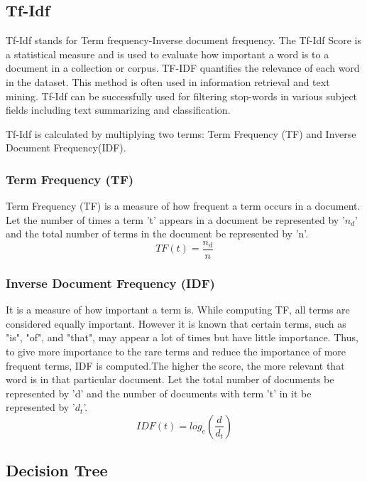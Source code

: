 \documentclass[preprint,12pt]{elsarticle}
\begin{document}
\subsection{Tf-Idf}

Tf-Idf stands for Term frequency-Inverse document frequency. The Tf-Idf Score is a statistical measure and is used to evaluate how important a word is to a document in a collection or corpus. TF-IDF quantifies the relevance of each word in the dataset. This method is often used in information retrieval and text mining. Tf-Idf can be successfully used for filtering stop-words \cite{tfidf_1,tfidf_2,tfidf_3} in various subject fields including text summarizing and classification.

Tf-Idf is calculated by multiplying two terms: Term Frequency (TF) and Inverse Document Frequency(IDF).

\subsubsection{Term Frequency (TF)}
Term Frequency (TF) is a measure of how frequent a term occurs in a document. Let the number of times a term 't' appears in a document be represented by '$n_d$' and the total number of terms in the document be represented by 'n'.
\begin{equation}
TF(t) = \dfrac{{n_d}}{n}
\end{equation}
\subsubsection{Inverse Document Frequency (IDF)}
It is a measure of how important a term is. While computing TF, all terms are considered equally important. However it is known that certain terms, such as "is", "of", and "that", may appear a lot of times but have little importance. Thus, to give more importance to the rare terms and reduce the importance of more frequent terms, IDF is computed.The higher the score, the more relevant that word is in that particular document. Let the total number of documents be represented by 'd' and the number of documents with term 't' in it be represented by '$d_t$'.
\begin{equation}
IDF(t) = log_e(\dfrac{d} {{d_t}})
\end{equation}

\subsection{Decision Tree}
\end{document}
